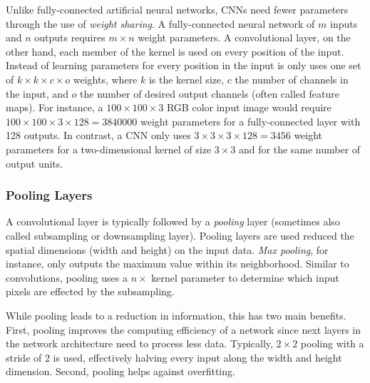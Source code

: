 Unlike fully-connected artificial neural networks, CNNs need fewer parameters through the use of \emph{weight sharing}. A fully-connected neural network of $m$ inputs and $n$ outputs requires $m \times n$ weight parameters. A convolutional layer, on the other hand, each member of the kernel is used on every position of the input. Instead of learning parameters for every position in the input is only uses one set of $k \times k \times c \times o$ weights, where $k$ is the kernel size, $c$ the number of channels in the input, and $o$ the number of desired output channels (often called feature maps). For instance, a $100 \times 100 \times 3$ RGB color input image would require $100 \times 100 \times 3 \times 128 = 3840000$ weight parameters for a fully-connected layer with \num{128} outputs. In contrast, a CNN only uses $3 \times 3 \times 3 \times 128 = 3456$ weight parameters for a two-dimensional kernel of size $3 \times 3$ and for the same number of output units.


\subsubsection{Pooling Layers}
A convolutional layer is typically followed by a \emph{pooling} layer (sometimes also called subsampling or downsampling layer). Pooling layers are used reduced the spatial dimensions (width and height) on the input data. \emph{Max pooling}, for instance, only outputs the maximum value within its neighborhood. Similar to convolutions, pooling uses a $n \times $ kernel parameter to determine which input pixels are effected by the subsampling.

	While pooling leads to a reduction in information, this has two main benefits. First, pooling improves the computing efficiency of a network since next layers in the network architecture need to process less data. Typically, $2 \times 2$ pooling with a stride of \num{2} is used, effectively halving every input along the width and height dimension. 	
	Second, pooling helps against overfitting.
	
